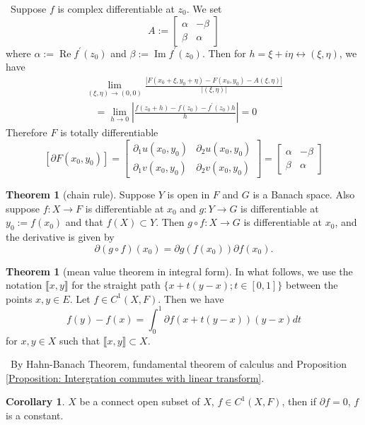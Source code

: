 \documentclass[12pt,a4paper]{book}
\newenvironment{prooff}{{\noindent\it\textcolor{cyan!40!black}{Proof}:}\,}{\par}
\theoremstyle{definition}
\newtheorem{coro}[defn]{Corollary}
\newtheorem{theo}[defn]{Theorem}
\begin{document}
\begin{prooff}
    Suppose $f$ is complex differentiable at $z_0$. We set
$$
A:=\left[\begin{array}{cc}
\alpha & -\beta \\
\beta & \alpha
\end{array}\right]
$$
where $\alpha:=\operatorname{Re} f^{\prime}\left(z_0\right)$ and $\beta:=\operatorname{Im} f^{\prime}\left(z_0\right)$. Then for $h=\xi+i \eta \longleftrightarrow(\xi, \eta)$, we have
$$
\begin{aligned}
\lim _{\left(\xi, \eta\right) \rightarrow(0,0)} \frac{\left|F\left(x_0+\xi, y_0+\eta\right)-F\left(x_0, y_0\right)-A(\xi, \eta)\right|}{|(\xi, \eta)|} \\
\quad=\lim _{h \rightarrow 0}\left|\frac{f\left(z_0+h\right)-f\left(z_0\right)-f^{\prime}\left(z_0\right) h}{h}\right|=0
\end{aligned}
$$
Therefore $F$ is totally differentiable
$$
\left[\partial F\left(x_0, y_0\right)\right]=\left[\begin{array}{ll}
\partial_1 u\left(x_0, y_0\right) & \partial_2 u\left(x_0, y_0\right) \\
\partial_1 v\left(x_0, y_0\right) & \partial_2 v\left(x_0, y_0\right)
\end{array}\right]=\left[\begin{array}{cc}
\alpha & -\beta \\
\beta & \alpha
\end{array}\right]
$$

\end{prooff}
\begin{theo}[chain rule]
    Suppose $Y$ is open in $F$ and $G$ is a Banach space. Also suppose $f: X \rightarrow F$ is differentiable at $x_0$ and $g: Y \rightarrow G$ is differentiable at $y_0:=f\left(x_0\right)$ and that $f(X) \subset Y$. Then $g \circ f: X \rightarrow G$ is differentiable at $x_0$, and the derivative is given by
    $$
    \partial(g \circ f)\left(x_0\right)=\partial g\left(f\left(x_0\right)\right) \partial f\left(x_0\right) .
    $$
\end{theo}
\begin{theo}[mean value theorem in integral form]
    In what follows, we use the notation $\llbracket x, y \rrbracket$ for the straight path $\{x+t(y-x) ; t \in[0,1]\}$ 
    between the points $x, y \in E$.
    Let $f \in C^1(X, F)$. Then we have
    $$
    f(y)-f(x)=\int_0^1 \partial f(x+t(y-x))(y-x) d t
    $$
    for $x, y \in X$ such that $\llbracket x, y \rrbracket \subset X$.
\end{theo}
\begin{prooff}
    By Hahn-Banach Theorem,  fundamental theorem of calculus and Proposition\,\ref{Proposition: Intergration commutes with linear transform}. 
\end{prooff}
\begin{coro}
    $X$ be a connect open subset of $X$, $f\in C^1(X,F)$, then if $\partial f=0$, $f$ is a constant. 
\end{coro}
\end{document}
